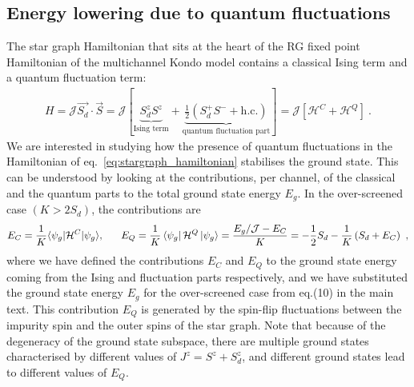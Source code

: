 \documentclass[reprint,onecolumn,prb,superscriptaddress]{revtex4-2}
\begin{document}
\subsection{Energy lowering due to quantum fluctuations}
The star graph Hamiltonian that sits at the heart of the RG fixed point Hamiltonian of the multichannel Kondo model contains a classical Ising term and a quantum fluctuation term:
\begin{equation}\begin{aligned}
	H = {\mathcal{J}}\vec{S_d}\cdot\vec S = \mathcal{J}\left[\underbrace{S_d^z S^z}_\text{Ising term} + \underbrace{\frac{1}{2}\left(S_d^+ S^- + \text{h.c.}\right)}_\text{quantum fluctuation part} \right] = \mathcal{J}\left[\mathcal{H}^C + \mathcal{H}^Q\right] ~.
	\label{eq:stargraph_hamiltonian}
\end{aligned}\end{equation}
We are interested in studying how the presence of quantum fluctuations in the Hamiltonian of eq.~\ref{eq:stargraph_hamiltonian} stabilises the ground state. This can be understood by looking at the contributions, per channel, of the classical and the quantum parts to the total ground state energy \(E_g\). In the over-screened case \(\left( K > 2S_d \right) \), the contributions are
\begin{gather}
	E_{C} = \frac{1}{K}\langle \psi_g | \mathcal{H}^C | \psi_g \rangle, ~~~~~ E_{Q} = \frac{1}{K}\bra{\psi_g}\mathcal{H}^Q \ket{\psi_g} =\frac{E_g/\mathcal{J} - E_{C}}{K} =  -\frac{1}{2}S_d - \frac{1}{K}\left(S_d + E_{C}\right)~,
\end{gather}  
where we have defined the contributions \(E_C\) and \(E_Q\) to the ground state energy coming from the Ising and fluctuation parts respectively, and we have substituted the ground state energy \(E_g\) for the over-screened case from eq.(10) in the main text. This contribution $E_Q$ is generated by the spin-flip fluctuations between the impurity spin and the outer spins of the star graph. Note that because of the degeneracy of the ground state subspace, there are multiple ground states characterised by different values of \(J^z = S^z + S_d^z\), and different ground states lead to different values of \(E_Q\).
\end{document}
